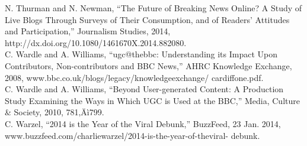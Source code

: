 N. Thurman and N. Newman, ``The Future of Breaking News Online?
A Study of Live Blogs Through Surveys of Their Consumption, and of
Readers' Attitudes and Participation,'' Journalism Studies, 2014,
http://dx.doi.org/10.1080/1461670X.2014.882080.\\
C. Wardle and A. Williams, ``ugc@thebbc: Understanding its Impact Upon
Contributors, Non-contributors and BBC News,'' AHRC Knowledge
Exchange, 2008, www.bbc.co.uk/blogs/legacy/knowledgeexchange/
cardiffone.pdf.\\
C. Wardle and A. Williams, ``Beyond User-generated Content: A
Production Study Examining the Ways in Which UGC is Used at the BBC,''
Media, Culture & Society, 2010, 781‚Äì799.\\
C. Warzel, ``2014 is the Year of the Viral Debunk,'' BuzzFeed, 23 Jan. 2014,
www.buzzfeed.com/charliewarzel/2014-is-the-year-of-theviral-
debunk.\\